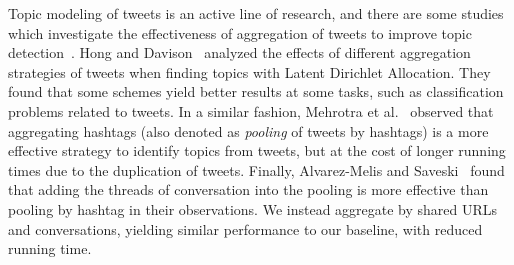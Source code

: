 Topic modeling of tweets is an active line of research, and there are some
studies which investigate the effectiveness of aggregation of tweets to improve
topic
detection~\cite{Hong:2010:EST:1964858.1964870,Mehrotra:2013:ILT:2484028.2484166,alvarez2016topic}.
Hong and Davison~\cite{Hong:2010:EST:1964858.1964870} analyzed the effects of
different aggregation strategies of tweets when finding topics with Latent
Dirichlet Allocation. They found that some schemes yield better results at some
tasks, such as classification problems related to tweets. In a similar fashion,
Mehrotra et al.~\cite{Mehrotra:2013:ILT:2484028.2484166} observed that
aggregating hashtags (also denoted as {\em pooling} of tweets by hashtags) is a
more effective strategy to identify topics from tweets, but at the cost of
longer running times due to the duplication of tweets. Finally, Alvarez-Melis
and Saveski~\cite{alvarez2016topic} found that adding the threads of
conversation into the pooling is more effective than pooling by hashtag in their
observations. We instead aggregate by shared URLs and conversations, yielding
similar performance to our baseline, with reduced running time.






